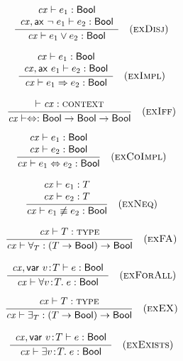 \begin{theorem}\label{thm-edisj}
{\rm
\[
\rruleII
 {\hastyO{\expr_1}{\bool}}
 {\hasty{\snoc{\cx}{\axM{\nega{\expr_1}}}}{\expr_2}{\bool}}
 {\hastyO{\disjO}{\bool}}
 {\Redisj}
\]
}
\end{theorem}

\begin{theorem}\label{thm-eimpl}
{\rm
\[
\rruleII
 {\hastyO{\expr_1}{\bool}}
 {\hasty{\snoc{\cx}{\axM{\expr_1}}}{\expr_2}{\bool}}
 {\hastyO{\implO}{\bool}}
 {\Reimpl}
\]
}
\end{theorem}

\begin{theorem}\label{thm-eiff}
{\rm
\[
\rruleI
 {\cxwfO}
 {\hastyO{\iiffop}{\tarr{\bool}{\tarr{\bool}{\bool}}}}
 {\Reiff}
\]
}
\end{theorem}

\begin{theorem}\label{thm-ecoimpl}
{\rm
\[
\rruleII
 {\hastyO{\expr_1}{\bool}}
 {\hastyO{\expr_2}{\bool}}
 {\hastyO{\iiffO}{\bool}}
 {\Recoimpl}
\]
}
\end{theorem}

\begin{theorem}\label{thm-eneq}
{\rm
\[
\rruleII
 {\hastyO{\expr_1}{\typ}}
 {\hastyO{\expr_2}{\typ}}
 {\hastyO{\neeqO}{\bool}}
 {\Reneq}
\]
}
\end{theorem}

\begin{theorem}\label{thm-efaop}
{\rm
\[
\rruleI
 {\istyO{\typ}}
 {\hastyO{\faopO}{\tarr{(\tarr{\typ}{\bool})}{\bool}}}
 {\Refaop}
\]
}
\end{theorem}

\begin{theorem}\label{thm-efa}
{\rm
\[
\rruleI
 {\hasty{\snoc{\cx}{\vdecO}}{\expr}{\bool}}
 {\hastyO{\faO}{\bool}}
 {\Refa}
\]
}
\end{theorem}

\begin{theorem}\label{thm-eexop}
{\rm
\[
\rruleI
 {\istyO{\typ}}
 {\hastyO{\exopO}{\tarr{(\tarr{\typ}{\bool})}{\bool}}}
 {\Reexop}
\]
}
\end{theorem}

\begin{theorem}\label{thm-eex}
{\rm
\[
\rruleI
 {\hasty{\snoc{\cx}{\vdecO}}{\expr}{\bool}}
 {\hastyO{\exO}{\bool}}
 {\Reex}
\]
}
\end{theorem}

